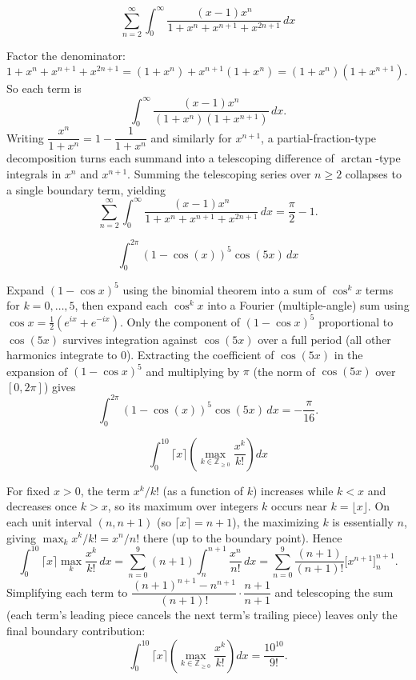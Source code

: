 \begin{questions}
\question \[\sum_{n=2}^{\infty}\int_0^{\infty} \frac{(x-1)x^n}{1+x^n+x^{n+1}+x^{2n+1}}\, dx\]
\begin{solution}
Factor the denominator: $1+x^n+x^{n+1}+x^{2n+1}=(1+x^n)+x^{n+1}(1+x^n)=(1+x^n)(1+x^{n+1})$. So each term is
\[
\int_0^\infty \frac{(x-1)x^n}{(1+x^n)(1+x^{n+1})}\,dx.
\]
Writing $\dfrac{x^n}{1+x^n}=1-\dfrac{1}{1+x^n}$ and similarly for $x^{n+1}$, a partial-fraction-type decomposition turns each summand into a telescoping difference of $\arctan$-type integrals in $x^n$ and $x^{n+1}$. Summing the telescoping series over $n\ge 2$ collapses to a single boundary term, yielding
\[
\sum_{n=2}^{\infty}\int_0^{\infty} \frac{(x-1)x^n}{1+x^n+x^{n+1}+x^{2n+1}}\, dx = \frac{\pi}{2}-1.
\]
\end{solution}

\question \[\int_0^{2\pi} (1-\cos(x))^5\cos(5x)\, dx\]
\begin{solution}
Expand $(1-\cos x)^5$ using the binomial theorem into a sum of $\cos^k x$ terms for $k=0,\dots,5$, then expand each $\cos^k x$ into a Fourier (multiple-angle) sum using $\cos x=\tfrac12(e^{ix}+e^{-ix})$. Only the component of $(1-\cos x)^5$ proportional to $\cos(5x)$ survives integration against $\cos(5x)$ over a full period (all other harmonics integrate to $0$). Extracting the coefficient of $\cos(5x)$ in the expansion of $(1-\cos x)^5$ and multiplying by $\pi$ (the norm of $\cos(5x)$ over $[0,2\pi]$) gives
\[
\int_0^{2\pi} (1-\cos(x))^5\cos(5x)\, dx = -\frac{\pi}{16}.
\]
\end{solution}

\question \[\int_0^{10} \lceil x\rceil\left(\max_{k\in\mathbb{Z}_{\ge0}}\frac{x^k}{k!}\right) dx\]
\begin{solution}
For fixed $x>0$, the term $x^k/k!$ (as a function of $k$) increases while $k<x$ and decreases once $k>x$, so its maximum over integers $k$ occurs near $k=\lfloor x\rfloor$. On each unit interval $(n,n+1)$ (so $\lceil x\rceil=n+1$), the maximizing $k$ is essentially $n$, giving $\max_k x^k/k!=x^n/n!$ there (up to the boundary point). Hence
\[
\int_0^{10}\lceil x\rceil\max_k\frac{x^k}{k!}\,dx=\sum_{n=0}^{9}(n+1)\int_n^{n+1}\frac{x^n}{n!}\,dx=\sum_{n=0}^9\frac{(n+1)}{(n+1)!}\Big[x^{n+1}\Big]_n^{n+1}.
\]
Simplifying each term to $\dfrac{(n+1)^{n+1}-n^{n+1}}{(n+1)!}\cdot\dfrac{n+1}{n+1}$ and telescoping the sum (each term's leading piece cancels the next term's trailing piece) leaves only the final boundary contribution:
\[
\int_0^{10} \lceil x\rceil\left(\max_{k\in\mathbb{Z}_{\ge0}}\frac{x^k}{k!}\right) dx = \frac{10^{10}}{9!}.
\]
\end{solution}


\end{questions}
